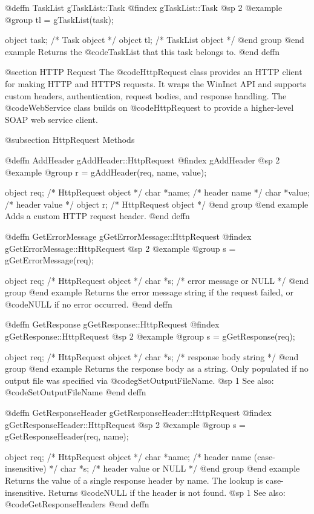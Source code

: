 @deffn {TaskList} gTaskList::Task
@findex gTaskList::Task
@sp 2
@example
@group
tl = gTaskList(task);

object  task;   /*  Task object      */
object  tl;     /*  TaskList object   */
@end group
@end example
Returns the @code{TaskList} that this task belongs to.
@end deffn




@section HTTP Request
The @code{HttpRequest} class provides an HTTP client for making
HTTP and HTTPS requests.  It wraps the WinInet API and supports
custom headers, authentication, request bodies, and response handling.
The @code{WebService} class builds on @code{HttpRequest} to provide
a higher-level SOAP web service client.

@subsection HttpRequest Methods



@deffn {AddHeader} gAddHeader::HttpRequest
@findex gAddHeader
@sp 2
@example
@group
r = gAddHeader(req, name, value);

object  req;     /*  HttpRequest object  */
char    *name;   /*  header name         */
char    *value;  /*  header value        */
object  r;       /*  HttpRequest object  */
@end group
@end example
Adds a custom HTTP request header.
@end deffn



@deffn {GetErrorMessage} gGetErrorMessage::HttpRequest
@findex gGetErrorMessage::HttpRequest
@sp 2
@example
@group
s = gGetErrorMessage(req);

object  req;   /*  HttpRequest object       */
char    *s;    /*  error message or NULL    */
@end group
@end example
Returns the error message string if the request failed, or @code{NULL}
if no error occurred.
@end deffn



@deffn {GetResponse} gGetResponse::HttpRequest
@findex gGetResponse::HttpRequest
@sp 2
@example
@group
s = gGetResponse(req);

object  req;   /*  HttpRequest object    */
char    *s;    /*  response body string  */
@end group
@end example
Returns the response body as a string.  Only populated if no output
file was specified via @code{gSetOutputFileName}.
@sp 1
See also:  @code{SetOutputFileName}
@end deffn



@deffn {GetResponseHeader} gGetResponseHeader::HttpRequest
@findex gGetResponseHeader::HttpRequest
@sp 2
@example
@group
s = gGetResponseHeader(req, name);

object  req;    /*  HttpRequest object         */
char    *name;  /*  header name (case-insensitive)  */
char    *s;     /*  header value or NULL        */
@end group
@end example
Returns the value of a single response header by name.  The lookup is
case-insensitive.  Returns @code{NULL} if the header is not found.
@sp 1
See also:  @code{GetResponseHeaders}
@end deffn



